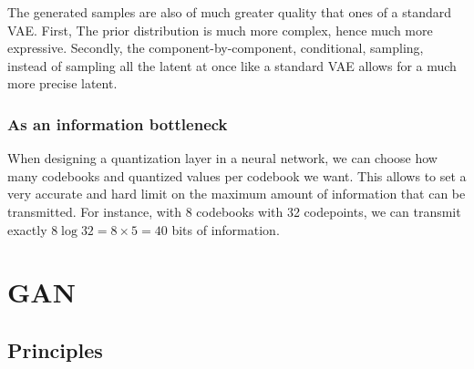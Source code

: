 The generated samples are also of much greater quality that ones of a standard VAE. First, The prior distribution is much more complex, hence much more expressive. Secondly, the component-by-component, conditional, sampling, instead of sampling all the latent at once like a standard VAE allows for a much more precise latent.

\subsubsection{As an information bottleneck}

When designing a quantization layer in a neural network, we can choose how many codebooks and quantized values per codebook we want. This allows to set a very accurate and hard limit on the maximum amount of information that can be transmitted. For instance, with 8 codebooks with 32 codepoints, we can transmit exactly $8 \log 32 = 8 \times 5 = 40$ bits of information.

\section{GAN}
\subsection{Principles}

